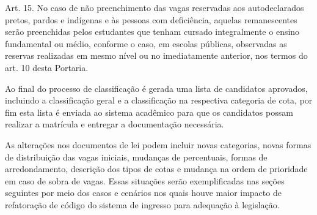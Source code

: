 \begin{citacao}
Art. 15. No caso de não preenchimento das vagas reservadas aos autodeclarados pretos, pardos
e indígenas e às pessoas com deficiência, aquelas remanescentes serão preenchidas pelos
estudantes que tenham cursado integralmente o ensino fundamental ou médio, conforme o caso,
em escolas públicas, observadas as reservas realizadas em mesmo nível ou no imediatamente
anterior, nos termos do art. 10 desta Portaria. \cite{portarianr9}
\end{citacao}

Ao final do processo de classificação é gerada uma lista de candidatos aprovados, incluindo a classificação geral e a classificação na respectiva categoria de cota, por fim esta lista é enviada ao sistema acadêmico para que os candidatos possam realizar a matrícula e entregar a documentação necessária. 

As alterações nos documentos de lei podem incluir novas categorias, novas formas de distribuição das vagas iniciais, mudanças de percentuais, formas de arredondamento, descrição dos tipos de cotas e mudança na ordem de prioridade em caso de sobra de vagas. Essas situações serão exemplificadas nas seções seguintes por meio dos casos e cenários nos quais houve maior impacto de refatoração de código do sistema de ingresso para adequação à legislação.








